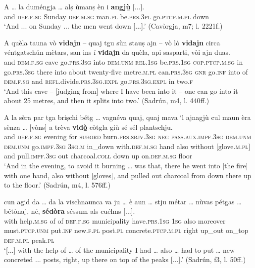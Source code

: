 \ea

\gll A … la duméngja … alṣ ùmanṣ èn i \textbf{angjù̱} [...].\\
and {} \textsc{def.f.sg} Sunday {} \textsc{def.m.sg} man.\textsc{pl} be.\textsc{prs.3pl} go.\textsc{ptcp.m.pl} down\\
\glt `And ... on Sunday ... the men went down [...].' (Cavòrgja, m7; l. 2221f.)
\z

\ea

\gll A quèla tauna vò \textbf{vidajn} – quaj tgu sùn stauṣ ajn – vò lò \textbf{vidajn} circa véntgatschún mè̱tars, san\footnotemark {} ins í \textbf{vidajn} da quèla, api sasparti, vòi ajn duas.\\
and \textsc{dem.f.sg} cave go.\textsc{prs.3sg} into {}  \textsc{dem.unm} \textsc{rel.1sg} be.\textsc{prs.1sg} \textsc{cop.ptcp.m.sg} in {} go.\textsc{prs.3sg} there into about twenty-five metre.\textsc{m.pl} can.\textsc{prs.3sg} \textsc{gnr} go.\textsc{inf} into of \textsc{dem.f.sg} and \textsc{refl}.divide.\textsc{prs.3sg.expl} go.\textsc{prs.3sg.expl} in two.\textsc{f}  \\
\glt `And this cave – [judging from] where I have been into it – one can go into it about 25 metres, and then it splits into two.' (Sadrún, m4, l. 440ff.)
\z

\ea

\gll  A la sèra par tga briṣchi bétg … vagnéva quaj, quaj mava `l ajnagjù cul maun èra sènza … [vòns] a trèva \textbf{vidò̱} còtgla giù sé sél plantschju.  \\
and \textsc{def.f.sg} evening for \textsc{subord} burn.\textsc{prs.sbjv.3sg} \textsc{neg} {} \textsc{pass.aux.impf.3sg} \textsc{dem.unm} \textsc{dem.unm} go.\textsc{impf.3sg} \textsc{3sg.m} in\_down with.\textsc{def.m.sg} hand also without {} [glove.\textsc{m.pl}] and pull.\textsc{impf.3sg} out charcoal.\textsc{coll} down up on.\textsc{def.m.sg} floor  \\
\glt `And in the evening, to avoid it burning … was that, there he went into [the fire] with one hand, also without [gloves], and pulled out charcoal from down there up to the floor.' (Sadrún, m4, l. 576ff.)
\z

\ea

\gll  [...] cun agid da … da la vischnaunca va ju … è aun … stju métar … nùvas pétgas … bétònaj\footnotemark,  né, \textbf{sédòra} séssum als cuélms [...].\\
{} with help.\textsc{m.sg} of {} of  \textsc{def.f.sg} municipality have.\textsc{prs.1sg} \textsc{1sg} {} also moreover {} must.\textsc{ptcp.unm} put.\textsc{inf} {} new.\textsc{f.pl}  post.\textsc{pl} {} concrete.\textsc{ptcp.m.pl} right up\_out  on\_top \textsc{def.m.pl} peak.\textsc{pl}\\
\glt `[...] with the help of … of the municipality I had … also … had to put … new concreted ... posts, right, up there on top of the peaks [...].' (Sadrún, f3, l. 50ff.)
\z

